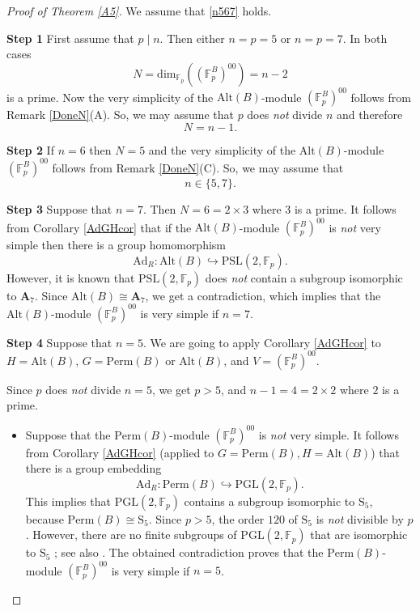 \documentclass[12pt,a4paper,reqno]{amsart}
\def\F{{\mathbb F}}
\def\Perm{\mathrm{Perm}}
\def\Alt{\mathrm{Alt}}
\def\dim{\mathrm{dim}}
\theoremstyle{definition}
\begin{document}
\begin{proof}[Proof of Theorem \ref{A5}]
We assume that \eqref{n567} holds.

{\bf Step 1} First assume  that $p\mid n$. Then either $n=p=5$ or $n=p=7$. In both
cases $$N=\dim_{\F_p}((\F_p^{B})^{00})=n-2$$ is a prime. 
Now the
very simplicity of  the $\mathrm{Alt}(B)$-module $(\F_p^{B})^{00}$ follows from  Remark \ref{DoneN}(A).
So, we may assume that $p$ does {\sl not} divide $n$ and therefore 
$$N=n-1.$$

{\bf Step 2} If $n=6$ then $N=5$ and the
very simplicity of  the $\mathrm{Alt}(B)$-module $(\F_p^{B})^{00}$ follows from  Remark \ref{DoneN}(C).
So, we may assume that 
$$n \in \{5,7\}.$$

{\bf Step 3} Suppose that $n=7$. Then $N=6 =2\times 3$ where  $3$ is a prime. 
It follows from Corollary  \ref{AdGHcor} that if  the $\mathrm{Alt}(B)$-module $(\F_p^{B})^{00}$ is {\sl not} very simple
then there is a  group homomorphism
$$\mathrm{Ad}_R: \mathrm{Alt}(B) \hookrightarrow \mathrm{PSL}(2,\F_p).$$
However,  it is known \cite[Th. 6.25 on p. 412 and Th. 626 on p. 414]{Suzuki} that $ \mathrm{PSL}(2,\F_p)$
does {\sl not} contain a subgroup isomorphic to $\mathbf{A}_7 $.  Since $\mathrm{Alt}(B) \cong \mathbf{A}_7$, we get a contradiction, which implies that
the $\mathrm{Alt}(B)$-module $(\F_p^{B})^{00}$ is  very simple if $n=7$.

{\bf Step 4} Suppose that $n=5$.  We are going to apply  Corollary  \ref{AdGHcor} to $H=\Alt(B)$, $G=\Perm(B)$ or $\Alt(B)$, and $V=(\F_p^{B})^{00}$.

Since $p$ does {\sl not} divide $n=5$, we get $p > 5$, and $n-1=4=2 \times 2$ where $2$ is a prime. 

\begin{itemize}
\item
Suppose that the $\mathrm{Perm}(B)$-module $(\F_p^{B})^{00}$ is {\sl not} very simple. It follows from Corollary  \ref{AdGHcor} (applied to $G=\Perm(B), H=\Alt(B)$)
that there is a group embedding
$$\mathrm{Ad}_R: \mathrm{Perm}(B) \hookrightarrow \mathrm{PGL}(2,\F_p).$$
This implies that $\mathrm{PGL}(2,\F_p)$ contains a subgroup isomorphic to $\mathrm{S}_5$, because  $\mathrm{Perm}(B)\cong \mathrm{S}_5$.
Since $p>5$, the order $120$ of $\mathrm{S}_5$ is {\sl not} divisible by $p$. However, there are no finite subgroups of $\mathrm{PGL}(2,\F_p)$
that are isomorphic to $\mathrm{S}_5$ \cite[Th. 6.25 on p. 412 and Th. 626 on p. 414]{Suzuki}; see  also \cite[Sect. 2.5]{Serre1972}. The obtained contradiction proves that 
the $\mathrm{Perm}(B)$-module $(\F_p^{B})^{00}$ is  very simple if $n=5$.




\end{itemize}
\end{proof}
\end{document}
